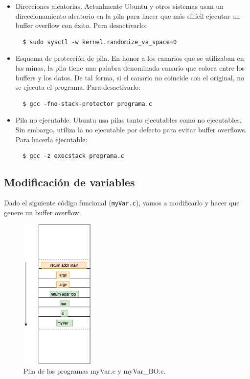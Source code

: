 \documentclass[a4,12pt,onecolum]{article}
\begin{document}
\begin{itemize}
  \item Direcciones aleatorias. Actualmente Ubuntu y otros sistemas usan un direccionamiento aleatorio en la pila para hacer que más difícil ejecutar un buffer overflow con éxito. Para desactivarlo:
  \begin{verbatim}
  $ sudo sysctl -w kernel.randomize_va_space=0
  \end{verbatim}

  \item Esquema de protección de pila. En honor a los canarios que se utilizaban en las minas, la pila tiene una palabra denominada canario que coloca entre los buffers y los datos. De tal forma, si el canario no coincide con el original, no se ejecuta el programa. Para desactivarlo:
  \begin{verbatim}
  $ gcc -fno-stack-protector programa.c
  \end{verbatim}

  \item Pila no ejecutable. Ubuntu usa pilas tanto ejecutables como no ejecutables. Sin embargo, utiliza la no ejecutable por defecto para evitar buffer overflows. Para hacerla ejecutable:
  \begin{verbatim}
  $ gcc -z execstack programa.c
  \end{verbatim}
\end{itemize}

\subsection{Modificación de variables}

Dado el siguiente código funcional (\texttt{myVar.c}), vamos a modificarlo y hacer que genere un buffer overflow.



\begin{figure}[H]
\centering
\includegraphics[width=0.325\textwidth]{./images/BOstack.png}
\caption{Pila de los programas myVar.c y myVar\_BO.c.}
\label{fig:bo1}
\end{figure}
\end{document}
